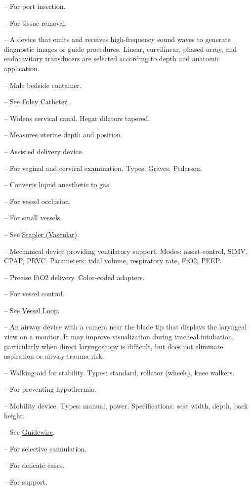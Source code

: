 -- For port insertion.

-- For tissue removal.

-- A device that emits and receives high-frequency sound waves to generate diagnostic images or guide procedures. Linear, curvilinear, phased-array, and endocavitary transducers are selected according to depth and anatomic application.


-- Male bedside container.

-- See \hyperlink{Foley Catheter}{Foley Catheter}.

-- Widens cervical canal. Hegar dilators tapered.

-- Measures uterine depth and position.

-- Assisted delivery device.

-- For vaginal and cervical examination. Types: Graves, Pedersen.

-- Converts liquid anesthetic to gas.

-- For vessel occlusion.

-- For small vessels.

-- See \hyperlink{Stapler (Vascular)}{Stapler (Vascular)}.

-- Mechanical device providing ventilatory support. Modes: assist-control, SIMV, CPAP, PRVC. Parameters: tidal volume, respiratory rate, FiO2, PEEP.

-- Precise FiO2 delivery. Color-coded adapters.

-- For vessel control.

-- See \hyperlink{Vessel Loop}{Vessel Loop}.

-- An airway device with a camera near the blade tip that displays the laryngeal view on a monitor. It may improve visualization during tracheal intubation, particularly when direct laryngoscopy is difficult, but does not eliminate aspiration or airway-trauma risk.

-- Walking aid for stability. Types: standard, rollator (wheels), knee walkers.

-- For preventing hypothermia.

-- Mobility device. Types: manual, power. Specifications: seat width, depth, back height.

-- See \hyperlink{Guidewire}{Guidewire}.

-- For selective cannulation.

-- For delicate cases.

-- For support.
